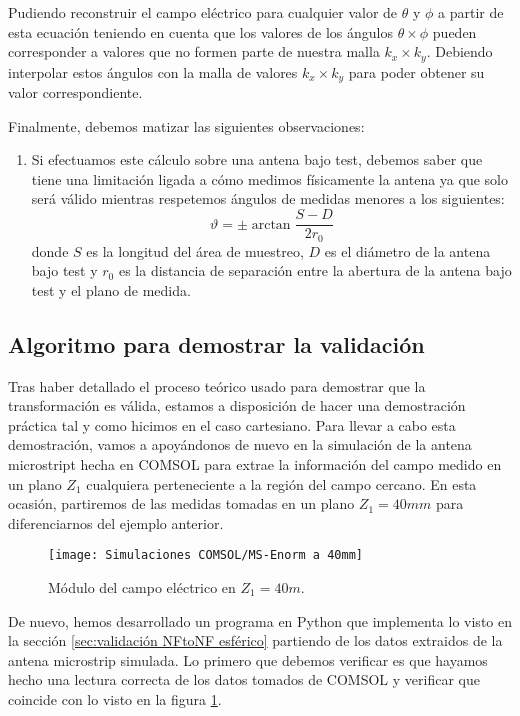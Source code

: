 Pudiendo reconstruir el campo eléctrico para cualquier valor de $\theta$ y $\phi$ a partir de esta ecuación teniendo en cuenta que los valores de los ángulos $\theta \times \phi$ pueden corresponder a valores que no formen parte de nuestra malla $k_{x}\times k_{y}$. Debiendo interpolar estos ángulos con la malla de valores  $k_{x}\times k_{y}$  para poder obtener su valor correspondiente.
\\

\newpage

Finalmente, debemos matizar las siguientes observaciones:
\begin{enumerate}
\item Si efectuamos este cálculo sobre una antena bajo test, debemos saber que tiene una limitación ligada a cómo medimos físicamente la antena ya que solo será válido mientras respetemos ángulos de medidas menores a los siguientes:
\begin{equation}
\vartheta = \pm\arctan \frac{S-D}{2r_{0}}
\end{equation}
donde $S$ es la longitud del área de muestreo, $D$ es el diámetro de la antena bajo test y $r_ {0}$ es la distancia de separación entre la abertura de la antena bajo test y el plano de medida.
\end{enumerate}

\newpage

\subsection{Algoritmo para demostrar la validación}
Tras haber detallado el proceso teórico usado para demostrar que la transformación es válida, estamos a disposición de hacer una demostración práctica tal y como hicimos en el caso cartesiano. Para llevar a cabo esta demostración, vamos a apoyándonos de nuevo en la simulación de la antena microstript hecha en COMSOL para extrae la información del campo medido en un plano $Z_1$ cualquiera perteneciente a la región del campo cercano. En esta ocasión, partiremos de las medidas tomadas en un plano $Z_1 = 40mm$ para diferenciarnos del ejemplo anterior. 

\begin{figure}[h]
  \centering
    \texttt{[image: Simulaciones COMSOL/MS-Enorm a 40mm]}
    \caption{Módulo del campo eléctrico en $Z_1 = 40m$.}
    \label{MS-Modulo del campo eléctrico en Z_1}
\end{figure}

De nuevo, hemos desarrollado un programa en Python que implementa lo visto en la sección \ref{sec:validación NFtoNF esférico} partiendo de los datos extraidos de la antena microstrip simulada. Lo primero que debemos verificar es que hayamos hecho una lectura correcta de los datos tomados de COMSOL y verificar que coincide con lo visto en la figura \ref{MS-Modulo del campo eléctrico en Z_1}.

